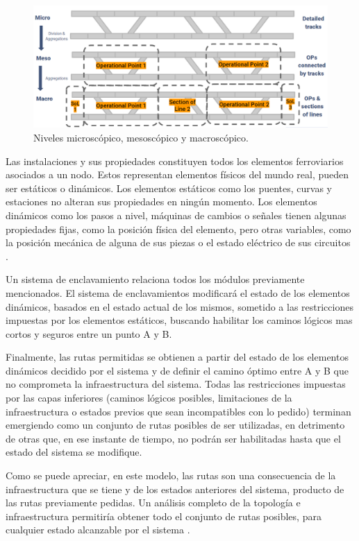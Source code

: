     \begin{figure}[!h]
        \centering
        \includegraphics[width=1\textwidth]{Figuras/railtopomodel}
        \centering\caption{Niveles microscópico, mesoscópico y macroscópico.}
        \label{fig:RTM_2}
    \end{figure}
    
    Las instalaciones y sus propiedades constituyen todos los elementos ferroviarios asociados a un nodo. Estos representan elementos físicos del mundo real, pueden ser estáticos o dinámicos. Los elementos estáticos como los puentes, curvas y estaciones no alteran sus propiedades en ningún momento. Los elementos dinámicos como los pasos a nivel, máquinas de cambios o señales tienen algunas propiedades fijas, como la posición física del elemento, pero otras variables, como la posición mecánica de alguna de sus piezas o el estado eléctrico de sus circuitos \cite{Paper_146,Paper_150}.

    Un sistema de enclavamiento relaciona todos los módulos previamente mencionados. El sistema de enclavamientos modificará el estado de los elementos dinámicos, basados en el estado actual de los mismos, sometido a las restricciones impuestas por los elementos estáticos, buscando habilitar los caminos lógicos mas cortos y seguros entre un punto A y B.

    Finalmente, las rutas permitidas se obtienen a partir del estado de los elementos dinámicos decidido por el sistema y de definir el camino óptimo entre A y B que no comprometa la infraestructura del sistema. Todas las restricciones impuestas por las capas inferiores (caminos lógicos posibles, limitaciones de la infraestructura o estados previos que sean incompatibles con lo pedido) terminan emergiendo como un conjunto de rutas posibles de ser utilizadas, en detrimento de otras que, en ese instante de tiempo, no podrán ser habilitadas hasta que el estado del sistema se modifique.

    Como se puede apreciar, en este modelo, las rutas son una consecuencia de la infraestructura que se tiene y de los estados anteriores del sistema, producto de las rutas previamente pedidas. Un análisis completo de la topología e infraestructura permitiría obtener todo el conjunto de rutas posibles, para cualquier estado alcanzable por el sistema \cite{Paper_150}.